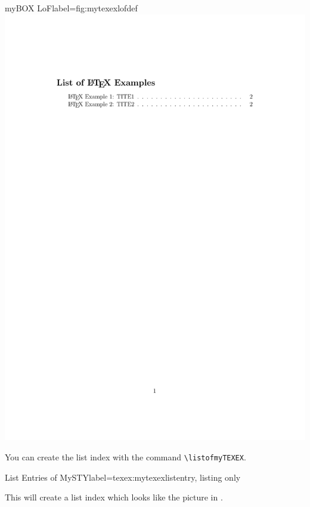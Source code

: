 \documentclass[]{myHOWTO-V001}
\begin{document}
\begin{minipage}{0.46\linewidth}
\centering
\begin{myFIGlst}{myBOX LoF}{label={fig:mytexexlofdef}}
	\includegraphics[page=1,scale=0.18]{examples/myTEXEXV000.pdf}
\end{myFIGlst}
\end{minipage}
\begin{minipage}{0.46\linewidth}
You can create the list index with the command \Verb|\listofmyTEXEX|.

\begin{myTEXEXdoclst}{List Entries of MySTY}{label={texex:mytexexlistentry}, listing only}
\listofmyTEXEX
\end{myTEXEXdoclst}

This will create a list index which looks like the picture in . 
\end{minipage}
\end{document}
